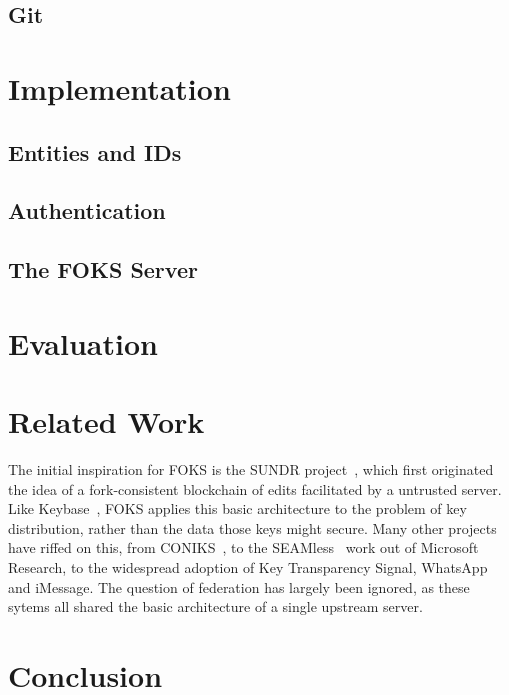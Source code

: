 \documentclass[11pt]{article}
\begin{document}
\subsection{Git}

\section{Implementation}

\subsection{Entities and IDs}
\label{sec:ids}

\subsection{Authentication}
\label{sec:authentication}

\subsection{The FOKS Server}
\label{sec:foks-server}

\section{Evaluation}

\section{Related Work}

The initial inspiration for FOKS is the SUNDR project~\cite{sundr}, which first
originated the idea of a fork-consistent blockchain of edits facilitated by a
untrusted server.  Like Keybase~\cite{keybase}, FOKS applies this basic
architecture to the problem of key distribution, rather than the data those keys
might secure. Many other projects have riffed on this, from
CONIKS~\cite{melara2015coniks}, to the SEAMless~\cite{chase2019seemless} work
out of Microsoft Research, to the widespread adoption of Key Transparency
Signal, WhatsApp and iMessage.  The question of federation has largely been
ignored, as these sytems all shared the basic architecture of a single upstream
server.

\section{Conclusion}



\end{document}
